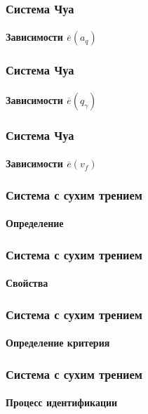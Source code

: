 \documentclass[10pt,utf8]{beamer}
\begin{document}
\begin{frame}
  \frametitle{Система Чуа}
  \framesubtitle{Зависимости $\overline{e}(a_q)$}


\end{frame}




\begin{frame}
  \frametitle{Система Чуа}
  \framesubtitle{Зависимости $\overline{e}(q_\gamma)$}


\end{frame}


\begin{frame}
  \frametitle{Система Чуа}
  \framesubtitle{Зависимости $\overline{e}(v_f)$}


\end{frame}




\begin{frame}
  \frametitle{Система с сухим трением}
  \framesubtitle{Определение}

\end{frame}



\begin{frame}
  \frametitle{Система с сухим трением}
  \framesubtitle{Свойства}

\end{frame}


\begin{frame}
  \frametitle{Система с сухим трением}
  \framesubtitle{Определение критерия}

\end{frame}



\begin{frame}
  \frametitle{Система с сухим трением}
  \framesubtitle{Процесс идентификации}

\end{frame}
\end{document}
